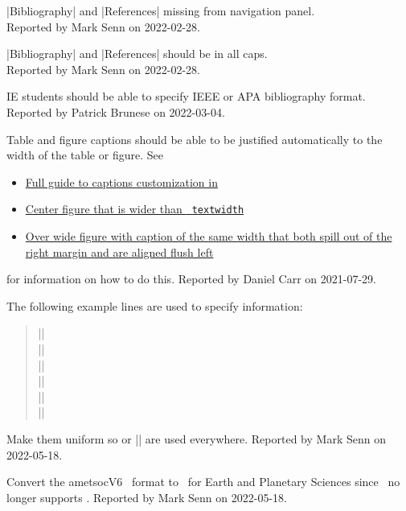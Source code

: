 |Bibliography| and |References| missing from navigation panel.\\
Reported by Mark Senn on 2022-02-28.

|Bibliography| and |References| should be in all caps.\\
Reported by Mark Senn on 2022-02-28.

IE students should be able
to specify IEEE
or APA bibliography format.\\
Reported by Patrick Brunese on 2022-03-04.

Table and figure captions
should be able to be justified automatically
to the width of the table or figure.
See
\begin{itemize}
\item
\href{https://latex-tutorial.com/caption-customization-latex}%
{Full guide to captions customization in \LaTeXLogo}
\item
\href{https://tex.stackexchange.com/questions/16582/center-figure-that-is-wider-than-textwidth/16584\#16584}%
{Center figure that is wider than {\tt {} textwidth}}
\item
\href{https://tex.stackexchange.com/questions/98971/over-wide-figure-with-caption-of-the-same-width-that-both-spill-out-of-the-right}%
{Over wide figure with caption of the same width that both spill out of the right margin and are aligned flush left}
\end{itemize}
for information on how to do this.
Reported by Daniel Carr on 2021-07-29.

The following example lines are used to specify information:
\begin{quote}
|\def\ZZinstitution{Purdue University}|\\
|\def\ZZcampus{West\space Lafayette}|\\
|\def\ZZprogram{Electrical and Computer Engineering}|\\
|\def\ZZdegree{Doctor of Philosophy}|\\
|\def\ZZdocument{A Dissertation}|\\
|\def\ZZgraduation{May 2022}|\\
\end{quote}
\vspace*{-16pt}
Make them uniform so 
or |\space| are used everywhere.
Reported by Mark Senn on 2022-05-18.

Convert the ametsocV6 \BibTeXLogo\ format
to \BibLaTeXLogo\ for Earth and Planetary Sciences
since \PurdueThesisLogo\ no longer supports \BibTeXLogo.
Reported by Mark Senn on 2022-05-18.


